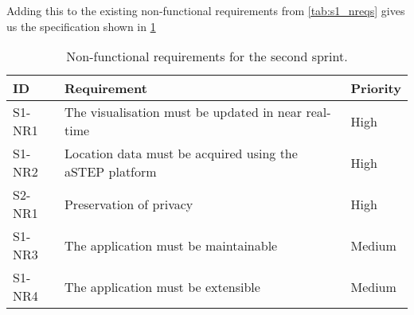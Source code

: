 Adding this to the existing non-functional requirements from \cref{tab:s1_nreqs} gives us the specification shown in \cref{tab:s2_nreqs}

\begin{table}[htbp]
	\centering
	\begin{tabularx}{\textwidth}{lXl}
		\toprule
		\textbf{ID} & \textbf{Requirement} & \textbf{Priority} \\
		\midrule 
		\rowcolor[HTML]{EFEFEF} 
		S1-NR1 & The visualisation must be updated in near real-time & High \\
		S1-NR2 & Location data must be acquired using the aSTEP platform & High \\
		\rowcolor[HTML]{EFEFEF}
		S2-NR1 & Preservation of privacy & High \\
		S1-NR3 & The application must be maintainable & Medium \\
		\rowcolor[HTML]{EFEFEF} 
		S1-NR4 & The application must be extensible & Medium \\
		\bottomrule
	\end{tabularx}
	\caption{Non-functional requirements for the second sprint.}
	\label{tab:s2_nreqs}
\end{table}
